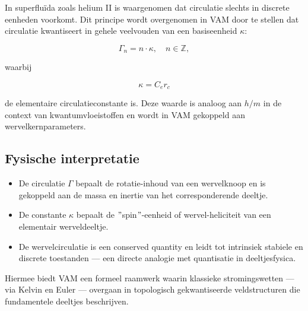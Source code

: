 In superfluïda zoals helium II is waargenomen dat circulatie slechts in discrete eenheden voorkomt. Dit principe wordt overgenomen in VAM door te stellen dat circulatie kwantiseert in gehele veelvouden van een basiseenheid \( \kappa \):

\begin{equation}
\Gamma_n = n \cdot \kappa, \quad n \in \mathbb{Z},
\end{equation}

waarbij

\begin{equation}
\kappa = C_e r_c
\end{equation}

de elementaire circulatieconstante is. Deze waarde is analoog aan \( h/m \) in de context van kwantumvloeistoffen en wordt in VAM gekoppeld aan wervelkernparameters.

\subsection{Fysische interpretatie}

\begin{itemize}
    \item De circulatie \( \Gamma \) bepaalt de rotatie-inhoud van een wervelknoop en is gekoppeld aan de massa en inertie van het corresponderende deeltje.
    \item De constante \( \kappa \) bepaalt de \("\)spin\("\)-eenheid of wervel-heliciteit van een elementair werveldeeltje.
    \item De wervelcirculatie is een conserved quantity en leidt tot intrinsiek stabiele en discrete toestanden — een directe analogie met quantisatie in deeltjesfysica.
\end{itemize}

Hiermee biedt VAM een formeel raamwerk waarin klassieke stromingswetten — via Kelvin en Euler — overgaan in topologisch gekwantiseerde veldstructuren die fundamentele deeltjes beschrijven.